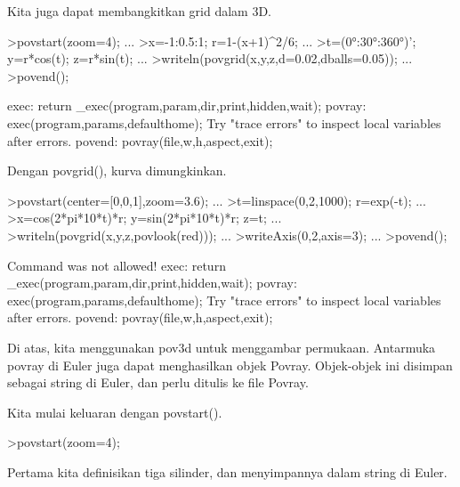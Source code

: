 \documentclass[a4paper,10pt]{article}
\begin{document}
\begin{eulernotebook}
\begin{eulercomment}
Kita juga dapat membangkitkan grid dalam 3D.
\end{eulercomment}
\begin{eulerprompt}
>povstart(zoom=4); ...
>x=-1:0.5:1; r=1-(x+1)^2/6; ...
>t=(0°:30°:360°)'; y=r*cos(t); z=r*sin(t); ...
>writeln(povgrid(x,y,z,d=0.02,dballs=0.05)); ...
>povend();
\end{eulerprompt}
\begin{euleroutput}
  exec:
      return _exec(program,param,dir,print,hidden,wait);
  povray:
      exec(program,params,defaulthome);
  Try "trace errors" to inspect local variables after errors.
  povend:
      povray(file,w,h,aspect,exit); 
\end{euleroutput}
\begin{eulercomment}
Dengan povgrid(), kurva dimungkinkan.
\end{eulercomment}
\begin{eulerprompt}
>povstart(center=[0,0,1],zoom=3.6); ...
>t=linspace(0,2,1000); r=exp(-t); ...
>x=cos(2*pi*10*t)*r; y=sin(2*pi*10*t)*r; z=t; ...
>writeln(povgrid(x,y,z,povlook(red))); ...
>writeAxis(0,2,axis=3); ...
>povend();
\end{eulerprompt}
\begin{euleroutput}
  Command was not allowed!
  exec:
      return _exec(program,param,dir,print,hidden,wait);
  povray:
      exec(program,params,defaulthome);
  Try "trace errors" to inspect local variables after errors.
  povend:
      povray(file,w,h,aspect,exit); 
\end{euleroutput}
\begin{eulercomment}
Di atas, kita menggunakan pov3d untuk menggambar permukaan. Antarmuka povray di Euler juga dapat menghasilkan objek
Povray. Objek-objek ini disimpan sebagai string di Euler, dan perlu ditulis ke file Povray.

Kita mulai keluaran dengan povstart().
\end{eulercomment}
\begin{eulerprompt}
>povstart(zoom=4);
\end{eulerprompt}
\begin{eulercomment}
Pertama kita definisikan tiga silinder, dan menyimpannya dalam string di Euler.


\end{eulercomment}
\end{eulernotebook}
\end{document}

